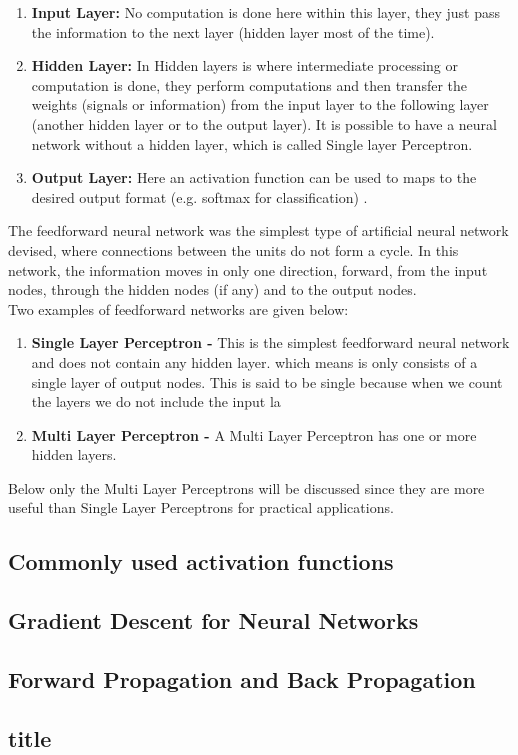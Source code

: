\begin{enumerate}
	\begin{enumerate}
		\item \textbf{Input Layer:} No computation is done here within this layer, they just pass the information to the next layer (hidden layer most of the time).
		\item \textbf{Hidden Layer:} In Hidden layers is where intermediate processing or computation is done, they perform computations and then transfer the weights (signals or information) from the input layer to the following layer (another hidden layer or to the output layer). It is possible to have a neural network without a hidden layer, which is called Single layer Perceptron.
		\item \textbf{Output Layer:} Here an activation function can be used to maps to the desired output format (e.g. softmax for classification) .
	\end{enumerate}
	The feedforward neural network was the simplest type of artificial neural network devised, where connections between the units do not form a cycle. In this network, the information moves in only one direction, forward, from the input nodes, through the hidden nodes (if any) and to the output nodes. \\
	Two examples of feedforward networks are given below:
	\begin{enumerate}
		\item \textbf{Single Layer Perceptron - } This is the simplest feedforward neural network and does not contain any hidden layer. which means is only consists of a single layer of output nodes. This is said to be single because when we count the layers we do not include the input la
		\item \textbf{Multi Layer Perceptron - } A Multi Layer Perceptron has one or more hidden layers. 
	\end{enumerate}
Below only the Multi Layer Perceptrons will be discussed since they are more useful than Single Layer Perceptrons for practical applications.

\end{enumerate}


\subsection{Commonly used activation functions}
\subsection{Gradient Descent for Neural Networks}
\subsection{Forward Propagation and Back Propagation}
\subsection{title}
